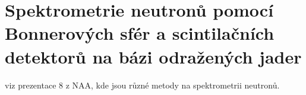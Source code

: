 \section[Spektrometrie neutronů]{Spektrometrie neutronů pomocí Bonnerových sfér a scintilačních detektorů na bázi odražených jader}

viz prezentace 8 z NAA, kde jsou různé metody na spektrometrii neutronů.
